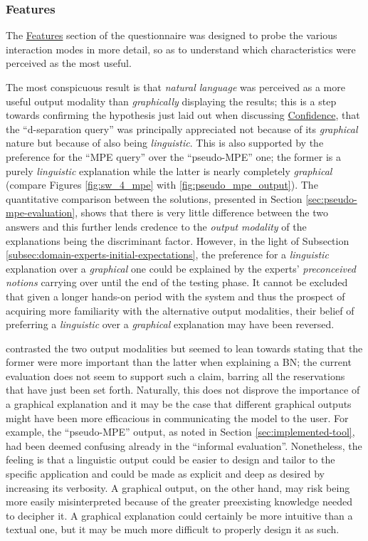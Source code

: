 \subsubsection{Features}
The \hyperref[ques:features]{Features} section of the questionnaire was designed to probe the various interaction modes in more detail, so as to understand which characteristics were perceived as the most useful.

The most conspicuous result is that \textit{natural language} was perceived as a more useful output modality than \textit{graphically} displaying the results; this is a step towards confirming the hypothesis just laid out when discussing \hyperref[ques:confidence]{Confidence}, that the \enquote{d-separation query} was principally appreciated not because of its \textit{graphical} nature but because of also being \textit{linguistic}.
This is also supported by the preference for the \enquote{MPE query} over the \enquote{pseudo-MPE} one; the former is a purely \textit{linguistic} explanation while the latter is nearly completely \textit{graphical} (compare Figures \ref{fig:sw_4_mpe} with \ref{fig:pseudo_mpe_output}).
The quantitative comparison between the solutions, presented in Section \ref{sec:pseudo-mpe-evaluation}, shows that there is very little difference between the two answers and this further lends credence to the \textit{output modality} of the explanations being the discriminant factor.
However, in the light of Subsection \ref{subsec:domain-experts-initial-expectations}, the preference for a \textit{linguistic} explanation over a \textit{graphical} one could be explained by the experts' \textit{preconceived notions} carrying over until the end of the testing phase.
It cannot be excluded that given a longer hands-on period with the system and thus the prospect of acquiring more familiarity with the alternative output modalities, their belief of preferring a \textit{linguistic} over a \textit{graphical} explanation may have been reversed.

\citet{lacave2002review} contrasted the two output modalities but seemed to lean towards stating that the former were more important than the latter when explaining a BN; the current evaluation does not seem to support such a claim, barring all the reservations that have just been set forth.
Naturally, this does not disprove the importance of a graphical explanation and it may be the case that different graphical outputs might have been more efficacious in communicating the model to the user.
For example, the \enquote{pseudo-MPE} output, as noted in Section \ref{sec:implemented-tool}, had been deemed confusing already in the \enquote{informal evaluation}.
Nonetheless, the feeling is that a linguistic output could be easier to design and tailor to the specific application and could be made as explicit and deep as desired by increasing its verbosity.
A graphical output, on the other hand, may risk being more easily misinterpreted because of the greater preexisting knowledge needed to decipher it.
A graphical explanation could certainly be more intuitive than a textual one, but it may be much more difficult to properly design it as such.

